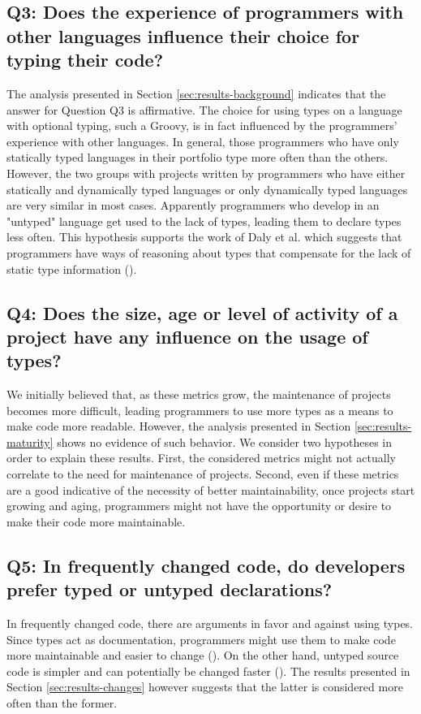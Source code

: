 \documentclass[msc]{ppgccufmg}
\begin{document}
\subsection*{Q3: Does the experience of programmers with other languages influence their choice for typing their code?\label{discussion-q3}}
The analysis presented in Section \ref{sec:results-background} indicates that the answer for Question Q3 is affirmative.
The choice for using types on a language with optional typing, such a Groovy, is in fact influenced by the programmers' experience with other languages.
In general, those programmers who have only statically typed languages in their portfolio type more often than the others.
However, the two groups with projects written by programmers who have either statically and dynamically typed languages or only dynamically typed languages are very similar in most cases.
Apparently programmers who develop in an "untyped" language get used to the lack of types, leading them to declare types less often.
This hypothesis supports the work of Daly et al. which suggests that programmers have ways of reasoning about types that compensate for the lack of static type information (\cite{ruby_vs_druby}).

\subsection*{Q4: Does the size, age or level of activity  of a project have any influence on the usage of types?\label{discussion-q4}}
We initially believed that, as these metrics grow, the maintenance of projects becomes more difficult, leading programmers to use more types as a means to make code more readable.
However, the analysis presented in Section \ref{sec:results-maturity} shows no evidence of such behavior.
We consider two hypotheses in order to explain these results.
First, the considered metrics might not actually correlate to the need for maintenance of projects.
Second, even if these metrics are a good indicative of the necessity of better maintainability, once projects start growing and aging, programmers might not have the opportunity or desire to make their code more maintainable.

\subsection*{Q5: In frequently changed code, do developers prefer typed or untyped declarations?\label{discussion-q5}}
In frequently changed code, there are arguments in favor and against using types.
Since types act as documentation, programmers might use them to make code more maintainable and easier to change  (\cite{should_your_specification_language_be_typed}).
On the other hand, untyped source code is simpler and can potentially be changed faster (\cite{gradual_typing}).
The results presented in Section \ref{sec:results-changes} however suggests that the latter is considered more often than the former.
\end{document}
